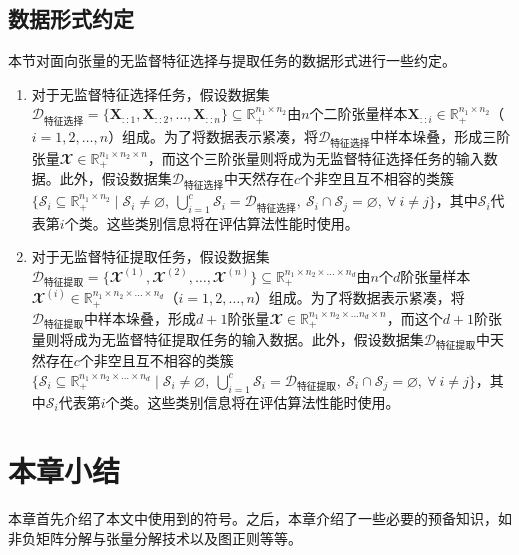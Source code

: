 \subsection{数据形式约定}\label{sec:dataasump}
本节对面向张量的无监督特征选择与提取任务的数据形式进行一些约定。
\begin{enumerate}
    \item 对于无监督特征选择任务，假设数据集$\mathcal{D}_{\text{特征选择}}=\{\boldsymbol{X}_{::1},\boldsymbol{X}_{::2},\ldots,\boldsymbol{X}_{::n}\}\subseteq\mathbb{R}_{+}^{n_{1}\times n_{2}}$由$n$个二阶张量样本$\boldsymbol{X}_{::i}\in\mathbb{R}_{+}^{n_{1}\times n_{2}}$（$i=1,2,\ldots,n$）组成。为了将数据表示紧凑，将$\mathcal{D}_{\text{特征选择}}$中样本垛叠，形成三阶张量$\mathbfcal{X}\in\mathbb{R}_{+}^{n_{1}\times n_{2}\times n}$，而这个三阶张量则将成为无监督特征选择任务的输入数据。此外，假设数据集$\mathcal{D}_{\text{特征选择}}$中天然存在$c$个非空且互不相容的类簇$\{\mathcal{S}_{i}\subseteq \mathbb{R}_{+}^{n_{1}\times n_{2}} \mid \mathcal{S}_{i} \neq \varnothing,~ \bigcup_{i=1}^{c}\mathcal{S}_{i}=\mathcal{D}_{\text{特征选择}},~ \mathcal{S}_{i} \cap \mathcal{S}_{j} = \varnothing,~ \forall~i\neq j\}$，其中$\mathcal{S}_{i}$代表第$i$个类。这些类别信息将在评估算法性能时使用。
    \item 对于无监督特征提取任务，假设数据集$\mathcal{D}_{\text{特征提取}}=\{\mathbfcal{X}^{(1)},\mathbfcal{X}^{(2)},\ldots,\mathbfcal{X}^{(n)}\}\subseteq\mathbb{R}_{+}^{n_{1}\times n_{2}\times \ldots \times n_{d}}$由$n$个$d$阶张量样本$\mathbfcal{X}^{(i)}\in\mathbb{R}_{+}^{n_{1}\times n_{2}\times \ldots \times n_{d}}$（$i=1,2,\ldots,n$）组成。为了将数据表示紧凑，将$\mathcal{D}_{\text{特征提取}}$中样本垛叠，形成$d+1$阶张量$\mathbfcal{X}\in\mathbb{R}_{+}^{n_{1}\times n_{2}\times \ldots n_{d}\times n}$，而这个$d+1$阶张量则将成为无监督特征提取任务的输入数据。此外，假设数据集$\mathcal{D}_{\text{特征提取}}$中天然存在$c$个非空且互不相容的类簇$\{\mathcal{S}_{i}\subseteq \mathbb{R}_{+}^{n_{1}\times n_{2}\times \ldots \times n_{d}} \mid \mathcal{S}_{i} \neq \varnothing,~ \bigcup_{i=1}^{c}\mathcal{S}_{i}=\mathcal{D}_{\text{特征提取}},~ \mathcal{S}_{i} \cap \mathcal{S}_{j} = \varnothing,~ \forall~i\neq j\}$，其中$\mathcal{S}_{i}$代表第$i$个类。这些类别信息将在评估算法性能时使用。
\end{enumerate}

\section{本章小结}
本章首先介绍了本文中使用到的符号。之后，本章介绍了一些必要的预备知识，如非负矩阵分解与张量分解技术以及图正则等等。

\afterpage{\null\newpage}\clearpage